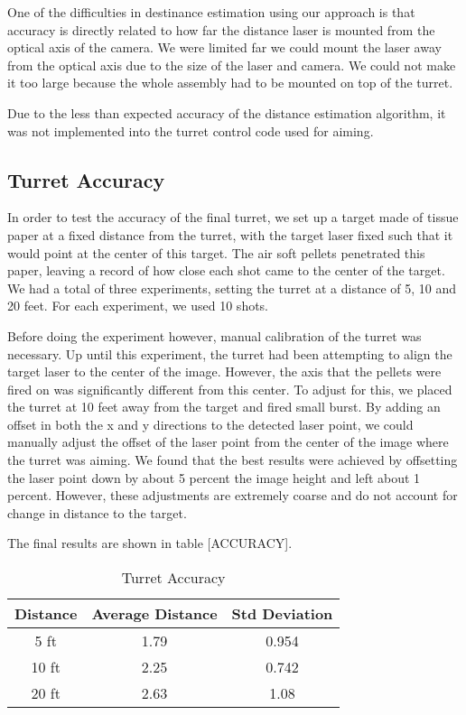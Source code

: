 \documentclass[10pt,twocolumn,letterpaper]{article}
\begin{document}
One of the difficulties in destinance estimation using our approach is that accuracy is directly related to how far the distance laser is mounted from the optical axis of the camera. We were limited far we could mount the laser away from the optical axis due to the size of the laser and camera. We could not make it too large because the whole assembly had to be mounted on top of the turret.

Due to the less than expected accuracy of the distance estimation algorithm, it was not implemented into the turret control code used for aiming.

\subsection{Turret Accuracy}

In order to test the accuracy of the final turret, we set up a target made of tissue paper at a fixed distance from the turret, with the target laser fixed such that it would point at the center of this target. The air soft pellets penetrated this paper, leaving a record of how close each shot came to the center of the target. We had a total of three experiments, setting the turret at a distance of 5, 10 and 20 feet. For each experiment, we used 10 shots.

Before doing the experiment however, manual calibration of the turret was necessary. Up until this experiment, the turret had been attempting to align the target laser to the center of the image. However, the axis that the pellets were fired on was significantly different from this center. To adjust for this, we placed the turret at 10 feet away from the target and fired small burst. By adding an offset in both the x and y directions to the detected laser point, we could manually adjust the offset of the laser point from the center of the image where the turret was aiming.  We found that the best results were achieved by offsetting the laser point down by about 5 percent the image height and left about 1 percent. However, these adjustments are extremely coarse and do not account for change in distance to the target.

The final results are shown in table [ACCURACY]. 

\begin{table}[ht]
\caption{Turret Accuracy}
\centering
\begin{tabular} {c c c}
\hline
Distance & Average Distance & Std Deviation\\
\hline
5 ft & 1.79 & 0.954 \\
10 ft & 2.25 & 0.742 \\
20 ft & 2.63 & 1.08 \\
\hline
\end{tabular}
\label{table:accuracy}
\end{table}
\end{document}
